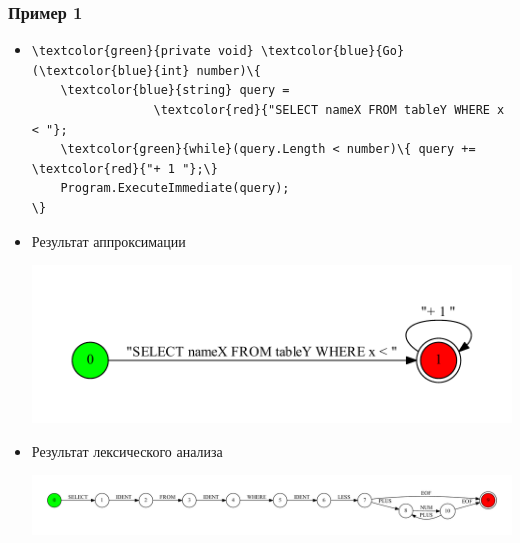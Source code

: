 \documentclass{beamer}
\begin{document}
\begin{frame}[fragile]
\transwipe[direction=90]
\frametitle{Пример 1}
\begin{itemize}
\item \begin{Verbatim}[commandchars=\\\{\}]
\textcolor{green}{private void} \textcolor{blue}{Go} (\textcolor{blue}{int} number)\{
    \textcolor{blue}{string} query =
                 \textcolor{red}{"SELECT nameX FROM tableY WHERE x < "};
    \textcolor{green}{while}(query.Length < number)\{ query += \textcolor{red}{"+ 1 "};\} 
    Program.ExecuteImmediate(query);
\}
\end{Verbatim}

\item Результат аппроксимации 
\begin{center}
   \includegraphics[width=.6\linewidth]{while_appr}
\end{center}
\item Результат лексического анализа \\
\begin{center}
   \includegraphics[width=1.0\linewidth]{WhileEx}
\end{center}
\end{itemize}
\end{frame}
\end{document}
